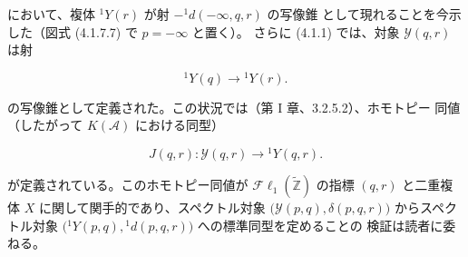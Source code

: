において、複体 ${}^{1}\!Y(r)$ が射 $-{}^{1}\!d(-\infty,q,r)$ の写像錐
として現れることを今示した（図式 (4.1.7.7) で $p=-\infty$ と置く）。
さらに (4.1.1) では、対象 $\mathcal Y(q,r)$ は射

\begin{equation}
{}^{1}\!Y(q)\longrightarrow{}^{1}\!Y(r).
\tag{4.1.7.9}
\end{equation}

の写像錐として定義された。この状況では（第 I 章、3.2.5.2）、ホモトピー
同値（したがって $K(\mathcal A)$ における同型）

\begin{equation}
J(q,r)\colon\mathcal Y(q,r)\longrightarrow{}^{1}\!Y(q,r).
\tag{4.1.7.10}
\end{equation}

が定義されている。このホモトピー同値が
$\mathcal{F}\ell_1(\widetilde{\mathbb Z})$ の指標 $(q,r)$ と二重複体 $X$
に関して関手的であり、スペクトル対象
$\bigl(\mathcal Y(p,q),\delta(p,q,r)\bigr)$ からスペクトル対象
$\bigl({}^{1}\!Y(p,q),{}^{1}\!d(p,q,r)\bigr)$ への標準同型を定めることの
検証は読者に委ねる。
\endgroup
